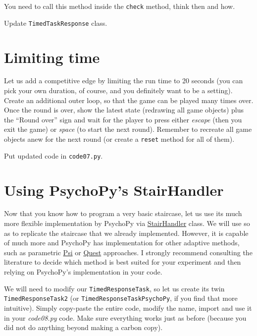 \documentclass[
]{book}
\begin{document}
You need to call this method inside the \texttt{check} method, think then and how.

Update \texttt{TimedTaskResponse} class.

\hypertarget{limiting-time}{%
\section{Limiting time}\label{limiting-time}}

Let us add a competitive edge by limiting the run time to 20 seconds (you can pick your own duration, of course, and you definitely want to be a setting). Create an additional outer loop, so that the game can be played many times over. Once the round is over, show the latest state (redrawing all game objects) plus the ``Round over'' sign and wait for the player to press either \emph{escape} (then you exit the game) or \emph{space} (to start the next round). Remember to recreate all game objects anew for the next round (or create a \texttt{reset} method for all of them).

Put updated code in \texttt{code07.py}.

\hypertarget{using-psychopys-stairhandler}{%
\section{Using PsychoPy's StairHandler}\label{using-psychopys-stairhandler}}

Now that you know how to program a very basic staircase, let us use its much more flexible implementation by PsychoPy via \href{https://psychopy.org/api/data.html\#stairhandler}{StairHandler} class. We will use so as to replicate the staircase that we already implemented. However, it is capable of much more and PsychoPy has implementation for other adaptive methods, such as parametric \href{https://psychopy.org/api/data.html\#psychopy.data.PsiHandler}{Psi} or \href{https://psychopy.org/api/data.html\#questhandler}{Quest} approaches. I strongly recommend consulting the literature to decide which method is best suited for your experiment and then relying on PsychoPy's implementation in your code.

We will need to modify our \texttt{TimedResponseTask}, so let us create its twin \texttt{TimedResponseTask2} (or \texttt{TimedResponseTaskPsychoPy}, if you find that more intuitive). Simply copy-paste the entire code, modify the name, import and use it in your \emph{code08.py} code. Make sure everything works just as before (because you did not do anything beyond making a carbon copy).
\end{document}
